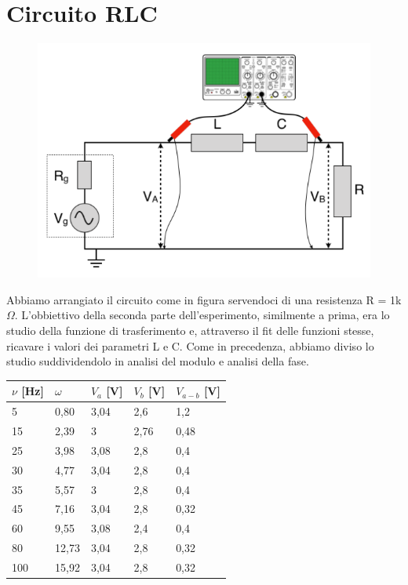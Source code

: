 \section{Circuito RLC}
\begin{figure}[H]
    \centering
    \includegraphics[scale=0.5]{Immagini/RLC.PNG}
    \caption{}
\end{figure}

Abbiamo arrangiato il circuito come in figura servendoci di una resistenza R = 1k$\Omega$.
L’obbiettivo della seconda parte dell’esperimento, similmente a prima, era lo studio della funzione di trasferimento e, attraverso il fit delle funzioni stesse, ricavare i valori dei parametri L e C.
Come in precedenza, abbiamo diviso lo studio suddividendolo in analisi del modulo e analisi della fase. 

\begin{table}[!ht]
    \centering
    \begin{tabular}{lllll}
    \toprule
         $\nu$ [Hz]  & $\omega$ & $V_a$ [V] & $V_b$ [V] & $V_{a-b}$ [V]  \\ 
         \midrule
        5  & 0,80 & 3,04 & 2,6 & 1,2  \\ 
        15  & 2,39 & 3 & 2,76 & 0,48  \\ 
        25  & 3,98 & 3,08 & 2,8 & 0,4  \\ 
        30  & 4,77 & 3,04 & 2,8 & 0,4  \\ 
        35  & 5,57 & 3 & 2,8 & 0,4  \\ 
        45  & 7,16 & 3,04 & 2,8 & 0,32  \\ 
        60  & 9,55 & 3,08 & 2,4 & 0,4  \\ 
        80  & 12,73 & 3,04 & 2,8 & 0,32  \\ 
        100  & 15,92 & 3,04 & 2,8 & 0,32  \\ 
        \bottomrule
    \end{tabular}
    \label{tabella 3}
\end{table}

